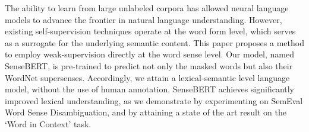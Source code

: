 The ability to learn from large unlabeled corpora has allowed neural language models to advance the frontier in natural language understanding. However, existing self-supervision techniques operate at the word form level, which serves as a surrogate for the underlying semantic content. This paper proposes a method to employ weak-supervision directly at the word sense level. Our model, named SenseBERT, is pre-trained to predict not only the masked words but also their WordNet supersenses. Accordingly, we attain a lexical-semantic level language model, without the use of human annotation. SenseBERT achieves significantly improved lexical understanding, as we demonstrate by experimenting on SemEval Word Sense Disambiguation, and by attaining a state of the art result on the `Word in Context' task.
